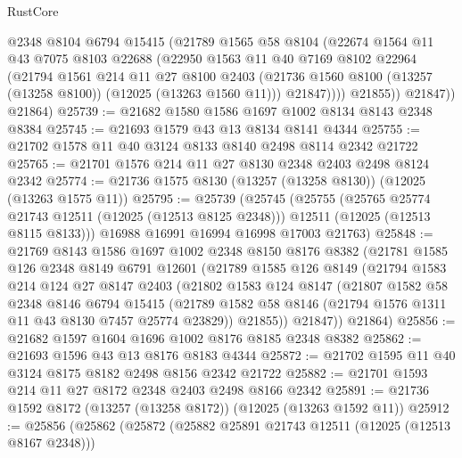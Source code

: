 \begin{lexlean}{RustCore}
\begin{coremodule}
              @2348
              @8104
              @6794
              @15415
              (@21789
                @1565
                @58
                @8104
                (@22674
                  @1564
                  @11
                  @43
                  @7075
                  @8103
                  @22688
                  (@22950
                    @1563
                    @11
                    @40
                    @7169
                    @8102
                    @22964
                    (@21794
                      @1561
                      @214
                      @11
                      @27
                      @8100
                      @2403
                      (@21736 @1560 @8100 (@13257 (@13258 @8100)) (@12025 (@13263 @1560 @11)))
                      @21847))))
              @21855))
          @21847))
      @21864)
@25739 := @21682 @1580 @1586 @1697 @1002 @8134 @8143 @2348 @8384
@25745 := @21693 @1579 @43 @13 @8134 @8141 @4344
@25755 := @21702 @1578 @11 @40 @3124 @8133 @8140 @2498 @8114 @2342 @21722
@25765 := @21701 @1576 @214 @11 @27 @8130 @2348 @2403 @2498 @8124 @2342
@25774 := @21736 @1575 @8130 (@13257 (@13258 @8130)) (@12025 (@13263 @1575 @11))
@25795 := @25739
    (@25745
      (@25755
        (@25765 @25774 @21743 @12511 (@12025 (@12513 @8125 @2348)))
        @12511
        (@12025 (@12513 @8115 @8133)))
      @16988
      @16991
      @16994
      @16998
      @17003
      @21763)
@25848 := @21769
    @8143
    @1586
    @1697
    @1002
    @2348
    @8150
    @8176
    @8382
    (@21781
      @1585
      @126
      @2348
      @8149
      @6791
      @12601
      (@21789
        @1585
        @126
        @8149
        (@21794
          @1583
          @214
          @124
          @27
          @8147
          @2403
          (@21802
            @1583
            @124
            @8147
            (@21807
              @1582
              @58
              @2348
              @8146
              @6794
              @15415
              (@21789 @1582 @58 @8146 (@21794 @1576 @1311 @11 @43 @8130 @7457 @25774 @23829))
              @21855))
          @21847))
      @21864)
@25856 := @21682 @1597 @1604 @1696 @1002 @8176 @8185 @2348 @8382
@25862 := @21693 @1596 @43 @13 @8176 @8183 @4344
@25872 := @21702 @1595 @11 @40 @3124 @8175 @8182 @2498 @8156 @2342 @21722
@25882 := @21701 @1593 @214 @11 @27 @8172 @2348 @2403 @2498 @8166 @2342
@25891 := @21736 @1592 @8172 (@13257 (@13258 @8172)) (@12025 (@13263 @1592 @11))
@25912 := @25856
    (@25862
      (@25872
        (@25882 @25891 @21743 @12511 (@12025 (@12513 @8167 @2348)))

\end{coremodule}
\end{lexlean}
